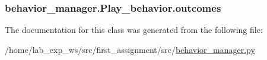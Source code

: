 \subsubsection[{\texorpdfstring{outcomes}{outcomes}}]{\setlength{\rightskip}{0pt plus 5cm}behavior\+\_\+manager.\+Play\+\_\+behavior.\+outcomes\hspace{0.3cm}{\ttfamily [static]}}\hypertarget{classbehavior__manager_1_1Play__behavior_a11a20a50a946c70874e35be560c006fa}{}\label{classbehavior__manager_1_1Play__behavior_a11a20a50a946c70874e35be560c006fa}


The documentation for this class was generated from the following file\+:\begin{DoxyCompactItemize}
\item 
/home/lab\+\_\+exp\+\_\+ws/src/first\+\_\+assignment/src/\hyperlink{behavior__manager_8py}{behavior\+\_\+manager.\+py}\end{DoxyCompactItemize}
